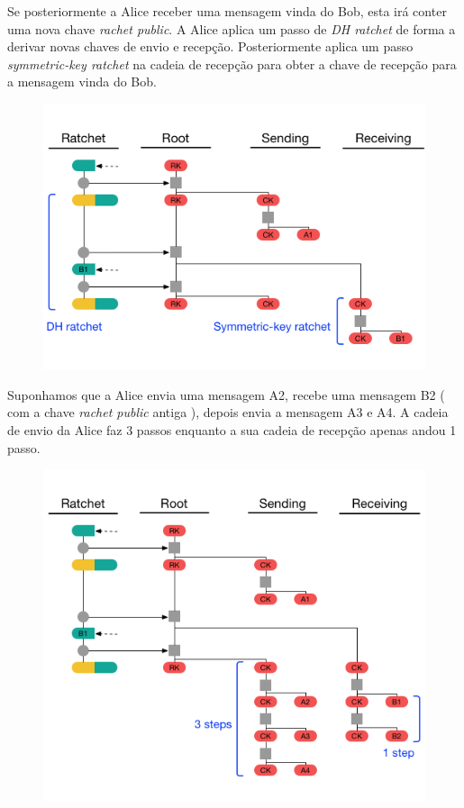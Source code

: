 Se posteriormente a Alice receber uma mensagem vinda do Bob, esta irá conter uma nova chave \textit{rachet public}. A Alice aplica um passo de \textit{DH ratchet} de forma a derivar novas chaves de envio e recepção. Posteriormente aplica um passo \textit{symmetric-key ratchet} na cadeia de recepção para obter a chave de recepção para a mensagem vinda do Bob.

\begin{figure}[H]
\begin{center}
\includegraphics[width=12cm]{img/DR3.png}
\caption{}
\label{diagram:DR3} 
\centering
\end{center}
\end{figure}

Suponhamos que a Alice envia uma mensagem A2, recebe uma mensagem B2 ( com a chave \textit{rachet public} antiga ), depois envia a mensagem A3 e A4. A cadeia de envio da Alice faz 3 passos enquanto a sua cadeia de recepção apenas andou 1 passo.

\begin{figure}[H]
\begin{center}
\includegraphics[width=12cm]{img/DR4.png}
\caption{}
\label{diagram:DR4} 
\centering
\end{center}
\end{figure}

